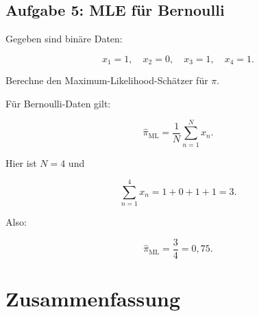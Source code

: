 \subsection{Aufgabe 5: MLE für Bernoulli}

Gegeben sind binäre Daten:

\[
    x_1=1,
    \quad
    x_2=0,
    \quad
    x_3=1,
    \quad
    x_4=1.
\]

Berechne den Maximum-Likelihood-Schätzer für \(\pi\).

\begin{examplebox}
Für Bernoulli-Daten gilt:

\[
    \hat{\pi}_{\mathrm{ML}}
    =
    \frac{1}{N}
    \sum_{n=1}^{N}
    x_n.
\]

Hier ist \(N=4\) und

\[
    \sum_{n=1}^{4}x_n
    =
    1+0+1+1
    =
    3.
\]

Also:

\[
    \hat{\pi}_{\mathrm{ML}}
    =
    \frac{3}{4}
    =
    0{,}75.
\]
\end{examplebox}

\section{Zusammenfassung}

